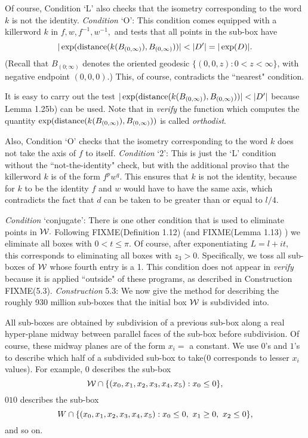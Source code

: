 Of course, Condition `L' also checks that the isometry corresponding to the word $k$ is not the identity.
{\it Condition}   `O':   This condition comes equipped with a killerword 
$k$ in $f, w, f^{-1}, w^{-1},$ and tests that all points in the sub-box have 
$$|\exp({\rm distance}(k(B_{(0,\infty)}),
B_{(0,\infty)}))| <  |D^{\prime}| = |\exp(D)|.$$    (Recall that 
$B_{(0;\infty)}$ denotes the oriented geodesic $\{(0,0,z): 0< z < \infty \}$,
with negative endpoint $(0,0,0).$)
This, of course, contradicts the ``nearest" condition.

It is easy to carry out the test $|\exp({\rm distance}(k(B_{(0,\infty)}), B_{(0,\infty)}))| <  |D^{\prime}|$ because
Lemma 1.25b) can be used. Note that in {\it verify} the function which computes the quantity
$\exp({\rm distance}(k(B_{(0,\infty)}), B_{(0,\infty)}))$ is called {\it orthodist}.  

Also, Condition `O' checks that the isometry corresponding to the word $k$ does not take the axis of $f$ to itself.
{\it Condition}   `2':  This is just the `L' condition without the ``not-the-identity" check, but with the additional
proviso that the killerword $k$ is of the form $f^p w^q.$ This ensures that $k$ is not the identity, because for $k$ to be
the identity $f$ and $w$ would have to have the same axis, which contradicts the fact that $d$ can be taken to be
greater than or equal to $l/4.$
\eject

{\it Condition}  `conjugate':  There is one other condition that is used to eliminate points in ${\cal W}.$  Following
FIXME(Definition 1.12)
 (and 
FIXME(Lemma 1.13)
) we eliminate all boxes with $0 < t \le \pi.$  Of course, after exponentiating $L = l+it,$
this corresponds to eliminating all boxes with $z_3 > 0.$ Specifically, we toss all sub-boxes of ${\cal W}$ whose fourth
entry is a 1. This condition does not appear in {\it verify} because it is applied ``outside" of these
programs, as described in Construction 
FIXME(5.3).
 {\it Construction} 5.3: 
We now give the method for describing the roughly 930 million sub-boxes that the initial box ${\cal W}$ is subdivided into.

All sub-boxes are obtained by subdivision of a previous sub-box along a real
hyper-plane midway between parallel faces of the sub-box before
subdivision.  Of course, these midway planes are of the form $x_i = $ a
constant.   We use $0$'s and $1$'s to describe which half of a subdivided
sub-box to take\break ($0$ corresponds to lesser $x_i$ values).  For example, 0
describes 
the sub-box $${\cal W} \cap \{(x_0,x_1,x_2,x_3,x_4,x_5): x_0 \le 0 \},$$ 
$010$ describes the sub-box 
$$W \cap \{(x_0,x_1,x_2,x_3,\break x_4,x_5) : x_0 \le 0,\ x_1 \ge 0,\ x_2 \le 0 \},$$
and so on.


